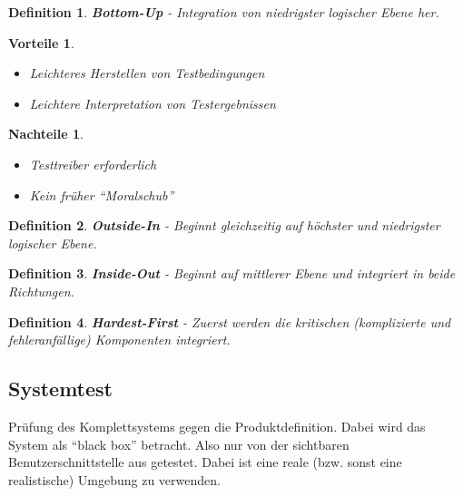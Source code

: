 \documentclass[a4paper]{article}
\theoremstyle{break}
\newtheorem{defi}{Definition}[section]
\newtheorem{why}{Vorteile}[section]
\newtheorem{whynot}{Nachteile}[section]
\begin{document}
          \begin{defi}
            \textbf{Bottom-Up} - Integration von niedrigster logischer Ebene her.
          \end{defi}
          \begin{why}
            \begin{itemize}
            \item Leichteres Herstellen von Testbedingungen
            \item Leichtere Interpretation von Testergebnissen
            \end{itemize}
          \end{why}
          \begin{whynot}
            \begin{itemize}
            \item Testtreiber erforderlich
            \item Kein früher ``Moralschub''
            \end{itemize}
          \end{whynot}
            

          \begin{defi}
            \textbf{Outside-In} - Beginnt gleichzeitig auf höchster und niedrigster logischer Ebene.
          \end{defi}

          \begin{defi}
            \textbf{Inside-Out} - Beginnt auf mittlerer Ebene und integriert in beide Richtungen.
          \end{defi}

          \begin{defi}
            \textbf{Hardest-First} - Zuerst werden die kritischen (komplizierte und fehleranfällige) Komponenten integriert.
          \end{defi}

          
          
          \subsection{Systemtest}
          Prüfung des Komplettsystems gegen die Produktdefinition. Dabei wird das System als ``black box'' betracht. Also nur von der sichtbaren Benutzerschnittstelle aus getestet. Dabei ist eine reale (bzw. sonst eine realistische) Umgebung zu verwenden.
\end{document}
